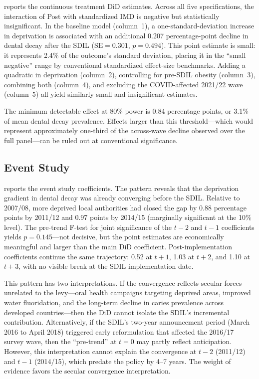 \documentclass[12pt]{article}
\begin{document}
 reports the continuous treatment DiD estimates. Across all five specifications, the interaction of Post with standardized IMD is negative but statistically insignificant. In the baseline model (column~1), a one-standard-deviation increase in deprivation is associated with an additional 0.207 percentage-point decline in dental decay after the SDIL ($\text{SE} = 0.301$, $p = 0.494$). This point estimate is small: it represents 2.4\% of the outcome's standard deviation, placing it in the ``small negative'' range by conventional standardized effect-size benchmarks. Adding a quadratic in deprivation (column~2), controlling for pre-SDIL obesity (column~3), combining both (column~4), and excluding the COVID-affected 2021/22 wave (column~5) all yield similarly small and insignificant estimates.



The minimum detectable effect at 80\% power is 0.84 percentage points, or 3.1\% of mean dental decay prevalence. Effects larger than this threshold---which would represent approximately one-third of the across-wave decline observed over the full panel---can be ruled out at conventional significance.

\subsection{Event Study}

 reports the event study coefficients. The pattern reveals that the deprivation gradient in dental decay was already converging before the SDIL. Relative to 2007/08, more deprived local authorities had closed the gap by 0.88 percentage points by 2011/12 and 0.97 points by 2014/15 (marginally significant at the 10\% level). The pre-trend F-test for joint significance of the $t - 2$ and $t - 1$ coefficients yields $p = 0.145$---not decisive, but the point estimates are economically meaningful and larger than the main DiD coefficient. Post-implementation coefficients continue the same trajectory: 0.52 at $t + 1$, 1.03 at $t + 2$, and 1.10 at $t + 3$, with no visible break at the SDIL implementation date.



This pattern has two interpretations. If the convergence reflects secular forces unrelated to the levy---oral health campaigns targeting deprived areas, improved water fluoridation, and the long-term decline in caries prevalence across developed countries---then the DiD cannot isolate the SDIL's incremental contribution. Alternatively, if the SDIL's two-year announcement period (March 2016 to April 2018) triggered early reformulation that affected the 2016/17 survey wave, then the ``pre-trend'' at $t = 0$ may partly reflect anticipation. However, this interpretation cannot explain the convergence at $t - 2$ (2011/12) and $t - 1$ (2014/15), which predate the policy by 4--7 years. The weight of evidence favors the secular convergence interpretation.
\end{document}
